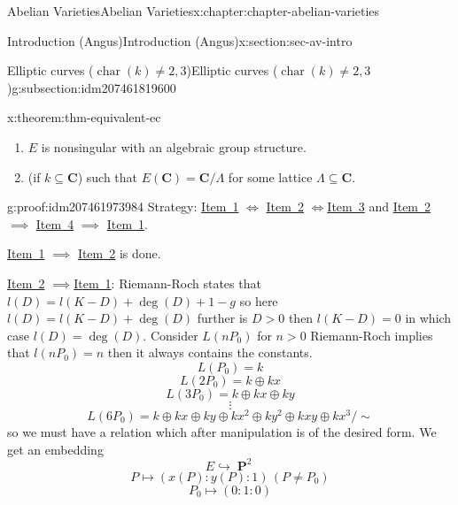 \documentclass[oneside,10pt,]{book}
\numberwithin{equation}{section}
\newcommand{\CC}{\mathbf{C}}
\DeclareMathOperator{\characteristic}{char}
\DeclareMathOperator{\PP}{\mathbf{P}}
\newcommand{\gt}{>}
\begin{document}
\begin{chapterptx}{Abelian Varieties}{}{Abelian Varieties}{}{}{x:chapter:chapter-abelian-varieties}
\begin{sectionptx}{Introduction (Angus)}{}{Introduction (Angus)}{}{}{x:section:sec-av-intro}
\begin{subsectionptx}{Elliptic curves (\(\characteristic(k) \ne 2,3\))}{}{Elliptic curves (\(\characteristic(k) \ne 2,3\))}{}{}{g:subsection:idm207461819600}
\begin{theorem}{}{}{x:theorem:thm-equivalent-ec}
\begin{enumerate}
\item\hypertarget{x:li:item-nonsing-gp}{}\(E\) is nonsingular with an algebraic group structure.%
\item\hypertarget{x:li:item-cmplx}{}(if \(k \subseteq \CC\)) such that \(E(\CC) = \CC/\Lambda\) for some lattice \(\Lambda \subseteq \CC\).%
\end{enumerate}
%
\end{theorem}
\begin{proofptx}{}{g:proof:idm207461973984}
Strategy: \hyperlink{x:li:item-cubic-eq}{Item~1} \(\iff\) \hyperlink{x:li:item-nonsing-pt}{Item~2} \(\iff\)\hyperlink{x:li:item-nonsing-gp}{Item~3} and \hyperlink{x:li:item-nonsing-pt}{Item~2} \(\implies\) \hyperlink{x:li:item-cmplx}{Item~4} \(\implies\) \hyperlink{x:li:item-cubic-eq}{Item~1}.%
\par
\hyperlink{x:li:item-cubic-eq}{Item~1} \(\implies\) \hyperlink{x:li:item-nonsing-pt}{Item~2} is done.%
\par
\hyperlink{x:li:item-nonsing-pt}{Item~2} \(\implies\)\hyperlink{x:li:item-cubic-eq}{Item~1}: Riemann-Roch states that \(l(D) = l(K-D) +  \deg(D) + 1 -g \) so here \(l(D) = l(K-D) + \deg (D)\) further is \(D\gt 0\) then \(l(K-D) = 0\) in which case \(l(D) = \deg(D)\). Consider \(L(nP_0)\) for \(n \gt 0\) Riemann-Roch implies that \(l(nP_0) = n\) then it always contains the constants.%
\begin{equation*}
L(P_0) = k
\end{equation*}
%
\begin{equation*}
L(2P_0) = k \oplus kx
\end{equation*}
%
\begin{equation*}
L(3P_0) = k \oplus kx \oplus ky
\end{equation*}
%
\begin{equation*}
\vdots
\end{equation*}
%
\begin{equation*}
L(6P_0) = k \oplus kx \oplus ky \oplus k x^2 \oplus ky^2 \oplus kxy \oplus kx^3/\sim
\end{equation*}
so we must have a relation which after manipulation is of the desired form. We get an embedding%
\begin{equation*}
E \hookrightarrow \PP^2
\end{equation*}
%
\begin{equation*}
P\mapsto (x(P):y(P): 1) \,(P\ne P_0)
\end{equation*}
%
\begin{equation*}
P_0 \mapsto (0:1 : 0)
\end{equation*}

\end{proofptx}
\end{subsectionptx}
\end{sectionptx}
\end{chapterptx}
\end{document}

